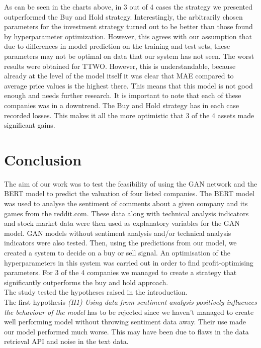 \documentclass[11pt]{article} %
\begin{document}
\begin{figure}[H]
\begin{adjustbox}{width=1.3\textwidth,center}

\end{adjustbox}
\end{figure}


 As can be seen in the charts above, in 3 out of 4 cases the strategy we presented outperformed the Buy and Hold strategy. Interestingly, the arbitrarily chosen parameters for the investment strategy turned out to be better than those found by hyperparameter optimization. However, this agrees with our assumption that due to differences in model prediction on the training and test sets, these parameters may not be optimal on data that our system has not seen. The worst results were obtained for TTWO. However, this is understandable, because already at the level of the model itself it was clear that MAE compared to average price values is the highest there. This means that this model is not good enough and needs further research. It is important to note that each of these companies was in a downtrend. The Buy and Hold strategy has in each case recorded losses. This makes it all the more optimistic that 3 of the 4 assets made significant gains. 

\section{Conclusion}

The aim of our work was to test the feasibility of using the GAN network and the BERT model to predict the valuation of four listed companies. The BERT model was used to analyse the sentiment of comments about a given company and its games from the reddit.com. These data along with technical analysis indicators and stock market data were then used as explanatory variables for the GAN model. GAN models without sentiment analysis and/or technical analysis indicators were also tested. Then, using the predictions from our model, we created a system to decide on a buy or sell signal. An optimisation of the hyperparameters in this system was carried out in order to find profit-optimising parameters. For 3 of the 4 companies we managed to create a strategy that significantly outperforms the buy and hold approach. \\

The study tested the hypotheses raised in the introduction. \\ 

The first hypothesis \textit{(H1) Using data from sentiment analysis positively influences the behaviour of the model} has to be rejected since we haven't managed to create well performing model without throwing sentiment data away. Their use made our model performed much worse. This may have been due to flaws in the data retrieval API and noise in the text data. \\
\end{document}
